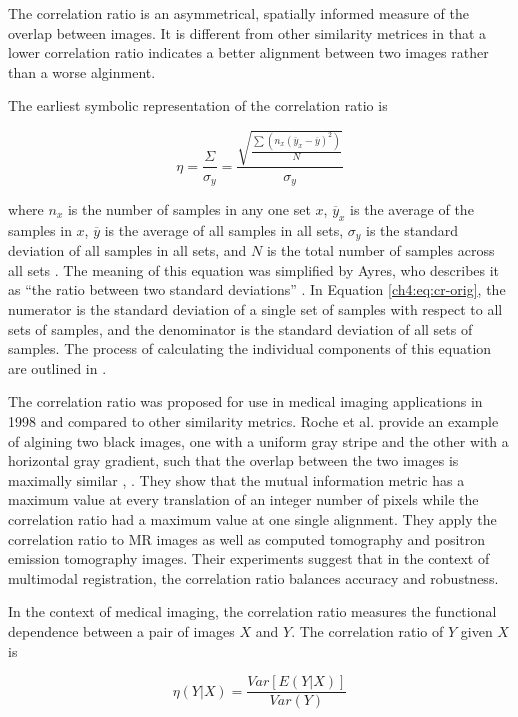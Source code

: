 The correlation ratio is an asymmetrical, spatially informed measure of the overlap between images. It is different from other similarity metrices in that a lower correlation ratio indicates a better alignment between two images rather than a worse alginment. 

The earliest symbolic representation of the correlation ratio is 

\begin{equation}
\label{ch4:eq:cr-orig}
\eta = \frac{\Sigma}{\sigma_y} = \frac{\sqrt{\frac{\sum(n_x(\overline{y}_x - \overline{y})^2)}{N}}}{\sigma_y}
\end{equation}

\noindent where $n_x$ is the number of samples in any one set $x$, $\overline{y}_x$ is the average of the samples in $x$, $\overline{y}$ is the average of all samples in all sets, $\sigma_y$ is the standard deviation of all samples in all sets, and $N$ is the total number of samples across all sets \cite{Rugg1917}. The meaning of this equation was simplified by Ayres, who describes it as ``the ratio between two standard deviations'' \cite{Ayres1920}. In Equation \ref{ch4:eq:cr-orig}, the numerator is the standard deviation of a single set of samples with respect to all sets of samples, and the denominator is the standard deviation of all sets of samples. The process of calculating the individual components of this equation are outlined in \cite{Rugg1917}.

The correlation ratio was proposed for use in medical imaging applications in 1998 and compared to other similarity metrics. Roche et al. provide an example of algining two black images, one with a uniform gray stripe and the other with a horizontal gray gradient, such that the overlap between the two images is maximally similar \cite{Roche1998a}, \cite{Roche1998}. They show that the mutual information metric has a maximum value at every translation of an integer number of pixels while the correlation ratio had a maximum value at one single alignment. They apply the correlation ratio to MR images as well as computed tomography and positron emission tomography images. Their experiments suggest that in the context of multimodal registration, the correlation ratio balances accuracy and robustness.

In the context of medical imaging, the correlation ratio measures the functional dependence between a pair of images $X$ and $Y$. The correlation ratio of $Y$ given $X$ is

\begin{equation}
\eta(Y|X) = \frac{Var[E(Y|X)]}{Var(Y)}
\end{equation}

